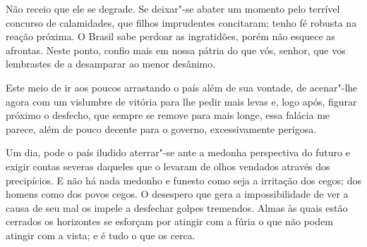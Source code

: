 \begin{linenumbers}
Não receio que ele se degrade. Se deixar"-se abater um momento pelo
terrível concurso de calamidades, que filhos imprudentes concitaram;
tenho fé robusta na reação próxima. O Brasil sabe perdoar as
ingratidões, porém não esquece as afrontas. Neste ponto, confio mais em
nossa pátria do que vós, senhor, que vos lembrastes de a desamparar ao menor desânimo.

Este meio de ir aos poucos arrastando o país além de sua vontade, de
acenar"-lhe agora com um vislumbre de vitória para lhe pedir mais
levas e, logo após, figurar próximo o desfecho, que sempre se remove
para mais longe, essa falácia me parece, além de pouco decente para o
governo, excessivamente perigosa. 

Um dia, pode o país iludido aterrar"-se ante a medonha perspectiva do
futuro e exigir contas severas daqueles que o levaram de olhos vendados
através dos precipícios. E não há nada medonho e funesto como seja a
irritação dos cegos; dos homens como dos povos cegos. O desespero que
gera a impossibilidade de ver a causa de seu mal os impele a desfechar
golpes tremendos. Almas às quais estão cerrados os horizontes se
esforçam por atingir com a fúria o que não podem atingir com a vista; e
é tudo o que os cerca. 

\end{linenumbers}

\sectionitem

